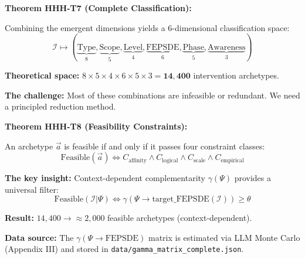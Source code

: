 \begin{tcolorbox}[colback=orange!5!white, colframe=orange!75!black,
    title=\textbf{The 14,400 Archetype Space}]

\textbf{Theorem HHH-T7 (Complete Classification):}

Combining the emergent dimensions yields a 6-dimensional classification space:
\begin{equation}
\mathcal{I} \mapsto (\underbrace{\text{Type}}_{8}, \underbrace{\text{Scope}}_{5}, \underbrace{\text{Level}}_{4}, \underbrace{\text{FEPSDE}}_{6}, \underbrace{\text{Phase}}_{5}, \underbrace{\text{Awareness}}_{3})
\end{equation}

\textbf{Theoretical space:} $8 \times 5 \times 4 \times 6 \times 5 \times 3 = \mathbf{14{,}400}$ intervention archetypes.

\textbf{The challenge:} Most of these combinations are infeasible or redundant. We need a principled reduction method.

\end{tcolorbox}

\begin{tcolorbox}[colback=green!5!white, colframe=green!75!black,
    title=\textbf{The Elegant Reduction: $\gamma(\Psi)$ Feasibility Filter}]

\textbf{Theorem HHH-T8 (Feasibility Constraints):}

An archetype $\vec{a}$ is feasible if and only if it passes four constraint classes:
\begin{equation}
\text{Feasible}(\vec{a}) \iff C_{\text{affinity}} \wedge C_{\text{logical}} \wedge C_{\text{scale}} \wedge C_{\text{empirical}}
\end{equation}

\textbf{The key insight:} Context-dependent complementarity $\gamma(\Psi)$ provides a universal filter:
\begin{equation}
\boxed{\text{Feasible}(\mathcal{I} | \Psi) \iff \gamma(\Psi \rightarrow \text{target\_FEPSDE}(\mathcal{I})) \geq \theta}
\end{equation}

\textbf{Result:} $14{,}400 \rightarrow \approx 2{,}000$ feasible archetypes (context-dependent).

\textbf{Data source:} The $\gamma(\Psi \rightarrow \text{FEPSDE})$ matrix is estimated via LLM Monte Carlo (Appendix III) and stored in \texttt{data/gamma\_matrix\_complete.json}.

\end{tcolorbox}

